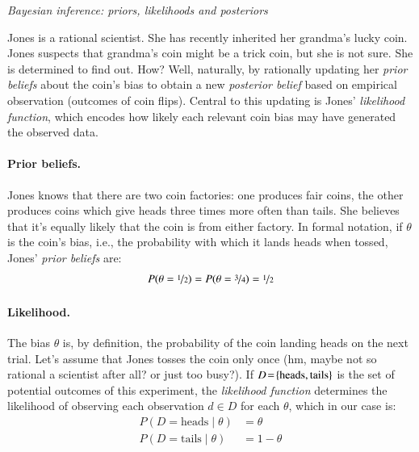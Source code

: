 \documentclass[nobib]{tufte-handout}
\begin{document}
\begin{InfoBox}[]
\centering
\colorbox{mygray}{\centering
  \begin{minipage}{1.0\textwidth}

    \emph{Bayesian inference: priors, likelihoods and posteriors}
    \medskip

    Jones is a rational scientist. She has recently inherited her grandma's lucky coin. Jones suspects that grandma's coin might be a trick coin, but she is not
    sure. She is determined to find out. How? Well, naturally, by rationally updating her
    \emph{prior beliefs} about the coin's bias to obtain a new \emph{posterior belief} based on
    empirical observation (outcomes of coin flips). Central to this updating is Jones'
    \emph{likelihood function}, which encodes how likely each relevant coin bias may have
    generated the observed data.
    
    \paragraph{Prior beliefs.} Jones knows that there are two coin factories: one produces fair
    coins, the other produces coins which give heads three times more often than tails. She
    believes that it's equally likely that the coin is from either factory. In formal notation,
    if $\theta$ is the coin's bias, i.e., the probability with which it lands heads when
    tossed, Jones' \emph{prior beliefs} are:
    \begin{align*}
      P(\theta = \nicefrac{1}{2}) = P(\theta = \nicefrac{3}{4}) = \nicefrac{1}{2}
    \end{align*}


    \paragraph{Likelihood.} The bias $\theta$ is, by definition, the probability of the coin
    landing heads on the next trial. Let's assume that Jones tosses the coin only once (hm,
    maybe not so rational a scientist after all? or just too busy?). If $D\!=\!\left\{\text{heads}, \text{tails}\right\}$ is the set of potential outcomes of this experiment, the \emph{likelihood
      function} determines the likelihood of observing each observation {$d\!\in D$} for each
    $\theta$, which in our case is:
    \begin{align*}
      P(D = \text{heads} \mid \theta) & =  \theta \\
      P(D = \text{tails} \mid \theta) & = 1 - \theta
    \end{align*}


\end{minipage}}
\end{InfoBox}
\end{document}
